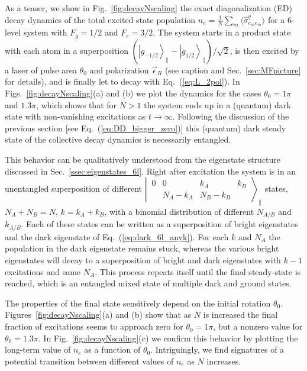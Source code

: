 \documentclass[aps,prx,superscriptaddress,twocolumn,notitlepage,nofootinbib,longbibliography]{revtex4-2}
\newcommand{\ket}[1]{\left|#1\right>}
\newcommand{\qusub}{q}
\begin{document}
As a teaser, we show in Fig.~\ref{fig:decayNscaling} the exact diagonalization (ED) decay dynamics of the total excited state population $n_e = \frac{1}{N} \sum_m \langle \hat{\sigma}^{\qusub}_{e_me_m}\rangle$ for a 6-level system with $F_g=1/2$ and $F_e=3/2$.
The system starts in a product state with each atom in a superposition $( \ket{g_{-1/2}}_\parallel - \ket{g_{1/2}}_\parallel)/\sqrt{2}$, is then excited by a laser of pulse area $\theta_0$ and polarization $\vec{\epsilon}_R$ (see caption and Sec.~\ref{sec:MFpicture} for details), and is finally let to decay with Eq.~(\ref{eq:L_2pol}).  In Figs.~\ref{fig:decayNscaling}(a) and (b) we plot the dynamics for the cases $\theta_0=1\pi$ and $1.3\pi$, which shows that for $N>1$ the system ends up in a (quantum) dark state with non-vanishing excitations as $t\rightarrow\infty$. Following the discussion of the previous section [see Eq.~(\ref{eq:DD_bigger_zero})] this (quantum) dark steady state of the collective decay dynamics is necessarily entangled.

This behavior can be qualitatively understood from the eigenstate structure discussed in Sec.~\ref{ssec:eigenstates_6l}. Right after excitation the system is in an unentangled superposition of different $\left|\, \begin{smallmatrix} 0 & 0 & k_A & k_B \\  & N_A-k_A & N_B-k_B &  \end{smallmatrix} \,\right\rangle_\parallel$ states, $N_A+N_B=N$, $k=k_A+k_B$, with a binomial distribution of different $N_{A/B}$ and $k_{A/B}$. Each of these states can be written as a superposition of bright eigenstates and the dark eigenstate of Eq.~(\ref{eq:dark_6l_anyk}). For each $k$ and $N_A$ the population in the dark eigenstate remains stuck, whereas the various bright eigenstates will decay to a superposition of bright and dark eigenstates with $k-1$ excitations and same $N_A$. 
This process repeats itself until the final steady-state is reached, which is an entangled mixed state of multiple dark and ground states.

The properties of the final state sensitively depend on the initial rotation $\theta_0$.
Figures~\ref{fig:decayNscaling}(a) and (b) show that as $N$ is increased the final fraction of excitations seems to approach zero for $\theta_0=1\pi$, but a nonzero value for $\theta_0=1.3\pi$.
In Fig.~\ref{fig:decayNscaling}(c) we confirm this behavior by plotting the long-term value of $n_e$ as a function of $\theta_0$. Intriguingly, we find signatures of a potential transition between different values of $n_e$ as $N$ increases.
\end{document}
